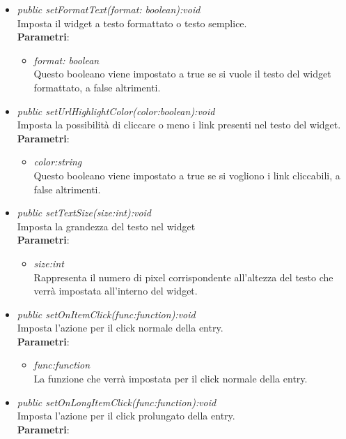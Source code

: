 \begin{itemize}
\begin{itemize}
\begin{itemize}
\begin{itemize}
		\end{itemize}
\item \textit{public setFormatText(format: boolean):void}\\
	Imposta il widget a testo formattato o testo semplice.
		\\ \textbf{Parametri}: \begin{itemize}
		\item \textit{format: boolean}\\
		Questo booleano viene impostato a true se si vuole il testo del widget formattato, a false altrimenti.
		\end{itemize} 
\item \textit{public setUrlHighlightColor(color:boolean):void}\\
	Imposta la possibilità di cliccare o meno i link presenti nel testo del widget.
		\\ \textbf{Parametri}: \begin{itemize}
		\item \textit{color:string}\\
		Questo booleano viene impostato a true se si vogliono i link cliccabili, a false altrimenti.
		\end{itemize} 
\item \textit{public setTextSize(size:int):void}\\
	Imposta la grandezza del testo nel widget
		\\ \textbf{Parametri}: \begin{itemize}
		\item \textit{size:int}\\
		Rappresenta il numero di pixel corrispondente all'altezza del testo che verrà impostata all'interno del widget.
		\end{itemize}
\item \textit{public setOnItemClick(func:function):void}\\
	Imposta l'azione per il click normale della entry.
		\\ \textbf{Parametri}: \begin{itemize}
		\item \textit{func:function}\\
		La funzione che verrà impostata per il click normale della entry.
		\end{itemize} 
\item \textit{public setOnLongItemClick(func:function):void}\\
	Imposta l'azione per il click prolungato della entry.	
		\\ \textbf{Parametri}: \begin{itemize}

\end{itemize}
\end{itemize}
\end{itemize}
\end{itemize}
